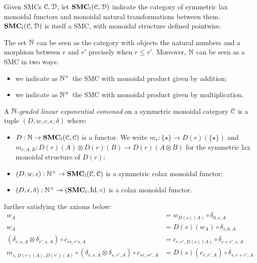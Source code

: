 


Given SMCs $\mathcal{C},\mathcal{D}$,  let $\mathbf{SMC}_{l}(\mathcal{C}, \mathcal{D})$ indicate the category of symmetric lax monoidal functors and monoidal natural transformations between them.
$\mathbf{SMC}_{l}(\mathcal{C}, \mathcal{D})$  is itself a SMC, with monoidal structure defined pointwise.

The set 
$\mathbb{N}$ can be seen as the category with objects the natural numbers and a morphism between $r$ and $r'$ precisely when $r\leq r'$. 
Moreover, $\mathbb{N}$ can be seen as a SMC in two ways:
\begin{itemize}

\item we indicate as $\mathbb{N}^{+}$ the SMC with monoidal product given by addition;
\item we indicate as $\mathbb{N}^{\times}$ the SMC with monoidal product given by multiplication.
\end{itemize}



\begin{definition}
A \emph{$\mathbb{N}$-graded linear exponential comonad} on a symmetric monoidal category $\mathcal{C}$ is a tuple
$(D, w,c,\epsilon,\delta)$ where:
\begin{itemize}

\item $D: \mathbb{N}\to \mathbf{SMC}_{l}(\mathcal{C}, \mathcal{C})$ is a functor. We write 
$m_{r}:\{\star\} \to D(r)(\{\star\})$ and $m_{r,A,B}: D(r)(A)\otimes D(r)(B) \to D(r)(A\otimes B)$ for the symmetric lax monoidal structure of $D(r)$;

\item $(D,w,c): \mathbb{N}^{+}\to \mathbf{SMC}_{l}(\mathcal{C}, \mathcal{C})$ is a symmetric colax monoidal functor;

\item $(D,\epsilon,\delta):\mathbb{N}^{\times}\to (\mathbf{SMC}_{l},\mathrm{Id},\circ) $ is a colax monoidal functor.



\end{itemize}
further satisfying the axioms below:
\begin{align}
w_{A}& =  w_{D(s)(A)}\circ \delta_{0,s,A}\\
w_{A} & = D(s)(w_{A} )\circ \delta_{s,0,A} \\
(\delta_{r,s,A}\otimes \delta_{r',s,A})\circ c_{rs,r's,A}
&=
c_{r,r',D(s)(A)}\circ \delta_{r+r',s,A}\\
m_{s,D(r)(A),D(r')(A)}\circ (\delta_{r,s,A}\otimes \delta_{s,r',A})\circ c_{sr,sr',A}&=
D(s)(c_{r,r',A})\circ \delta_{s,r+r',A}
\end{align}
\end{definition}


